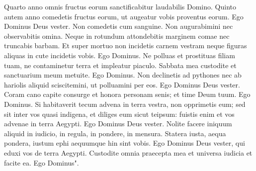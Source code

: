 \begin{biblechapter}
\verse Quarto anno omnis fructus eorum sanctificabitur laudabilis Domino. 
\verse Quinto autem anno comedetis fructus eorum, ut augeatur vobis proventus eorum. Ego Dominus Deus vester. 
\verse Non comedetis cum sanguine. Non augurabimini nec observabitis omina. 
\verse Neque in rotundum attondebitis marginem comae nec truncabis barbam. 
\verse Et super mortuo non incidetis carnem vestram neque figuras aliquas in cute incidetis vobis. Ego Dominus. 
\verse Ne polluas et prostituas filiam tuam, ne contaminetur terra et impleatur piaculo. 
\verse Sabbata mea custodite et sanctuarium meum metuite. Ego Dominus. 
\verse Non declinetis ad pythones nec ab hariolis aliquid sciscitemini, ut polluamini per eos. Ego Dominus Deus vester. 
\verse Coram cano capite consurge et honora personam senis; et time Deum tuum. Ego Dominus. 
\verse Si habitaverit tecum advena in terra vestra, non opprimetis eum; 
\verse sed sit inter vos quasi indigena, et diliges eum sicut teipsum: fuistis enim et vos advenae in terra Aegypti. Ego Dominus Deus vester. 
\verse Nolite facere iniquum aliquid in iudicio, in regula, in pondere, in mensura. 
\verse Statera iusta, aequa pondera, iustum ephi aequumque hin sint vobis. Ego Dominus Deus vester, qui eduxi vos de terra Aegypti. 
\verse Custodite omnia praecepta mea et universa iudicia et facite ea. Ego Dominus". 
\end{biblechapter}

